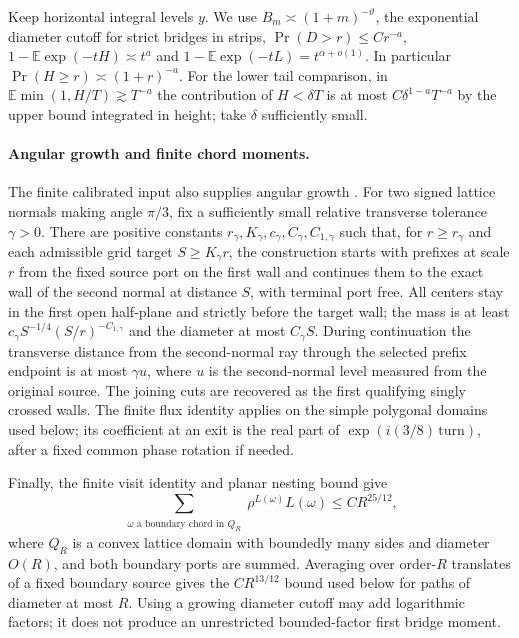 Keep horizontal integral levels $y$. We use \(B_m\asymp (1+m)^{-\vartheta}\), the exponential diameter cutoff for strict bridges in strips, \(\Pr(D>r)\le C r^{-a}\), \(1-\mathbb E\exp(-tH)\asymp t^a\) and \(1-\mathbb E\exp(-tL)=t^{\alpha+o(1)}\). In particular \(\Pr(H\ge r)\asymp (1+r)^{-a}\). For the lower tail comparison, in \(\mathbb E\min(1,H/T)\gtrsim T^{-a}\) the contribution of \(H<\delta T\) is at most \(C\delta^{1-a}T^{-a}\) by the upper bound integrated in height; take \(\delta\) sufficiently small.

\paragraph{Angular growth and finite chord moments.}
The finite calibrated input also supplies angular growth
\cite[Section~11, Recoverable half-plane growth]{compL}.
For two signed lattice normals making angle $\pi/3$, fix a sufficiently
small relative transverse tolerance $\gamma>0$. There are positive constants
$r_\gamma,K_\gamma,c_\gamma,C_\gamma,C_{1,\gamma}$ such that, for
$r\ge r_\gamma$ and each admissible grid target $S\ge K_\gamma r$,
the construction starts with prefixes at scale $r$ from the fixed source
port on the first wall and continues them to the exact wall of the second
normal at distance $S$, with terminal port free. All centers stay in the first open half-plane and strictly
before the target wall; the mass is at least
$c_\gamma S^{-1/4}(S/r)^{-C_{1,\gamma}}$ and the diameter at most $C_\gamma S$.
During continuation the transverse distance from the second-normal ray
through the selected prefix endpoint is at most $\gamma u$, where $u$
is the second-normal level measured from the original source.
The joining cuts are recovered as the first qualifying singly crossed
walls. The finite flux identity applies on the simple polygonal domains
used below; its coefficient at an exit is the real part of
$\exp(i(3/8)\,\mathrm{turn})$, after a fixed common phase rotation if needed.

Finally, the finite visit identity and planar nesting bound give
\cite[Proposition~11.1]{compL}
\begin{equation}
 \sum_{\substack{\omega\text{ a boundary chord in }Q_R}}
       \rho^{L(\omega)}L(\omega)\le C R^{25/12},
 \label{R:cal:box-moment}
\end{equation}
where $Q_R$ is a convex lattice domain with boundedly many sides and
diameter $O(R)$, and both boundary
ports are summed. Averaging over order-$R$ translates of a fixed boundary
source gives the $CR^{13/12}$ bound used below for paths of diameter at
most $R$. Using a growing diameter cutoff may add logarithmic factors; it
does not produce an unrestricted bounded-factor first bridge moment.

